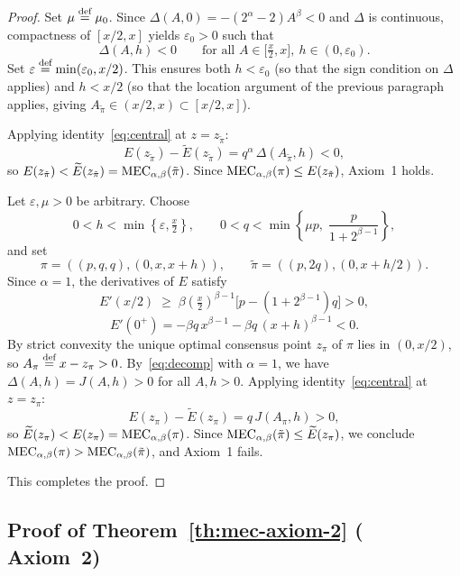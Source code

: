 \begin{proof}
Set $\mu\stackrel{\text{def}}{=}\mu_0$. Since $\Delta(A,0)=-(2^\alpha-2)A^\beta<0$ and $\Delta$ is continuous,
compactness of $[x/2,x]$ yields $\varepsilon_0>0$ such that
\[
  \Delta(A,h)<0
  \qquad\text{for all }A\in\bigl[\tfrac x2,x\bigr],\ h\in(0,\varepsilon_0).
\]
Set $\varepsilon\stackrel{\text{def}}{=}\min(\varepsilon_0,x/2)$. This ensures both $h<\varepsilon_0$ (so that the sign
condition on $\Delta$ applies) and $h<x/2$ (so that the location argument
of the previous paragraph applies, giving $A_{\tilde\pi}\in(x/2,x)\subset[x/2,x]$).

Applying identity~\eqref{eq:central} at $z=z_{\tilde\pi}$:
\[
  E(z_{\tilde\pi})-\widetilde{E}(z_{\tilde\pi})=q^\alpha\,\Delta(A_{\tilde\pi},h)<0,
\]
so $E(z_{\tilde\pi})<\widetilde{E}(z_{\tilde\pi})=\MEC(\tilde\pi)$. Since
$\MEC(\pi)\leq E(z_{\tilde\pi})$, Axiom~1 holds.

Let $\varepsilon,\mu>0$ be arbitrary. Choose
\[
  0<h<\min\!\left\{\varepsilon,\tfrac x2\right\},
  \qquad
  0<q<\min\!\left\{\mu p,\;\frac{p}{1+2^{\beta-1}}\right\},
\]
and set
\[
  \pi=((p,q,q),(0,x,x+h)),
  \qquad
  \tilde\pi=((p,2q),(0,x+h/2)).
\]
Since $\alpha=1$, the derivatives of $E$ satisfy
\[
  E'(x/2)\;\geq\;
  \beta\!\left(\tfrac x2\right)^{\!\beta-1}\!\bigl[p-(1+2^{\beta-1})q\bigr]>0,
\]
\[
  E'(0^+)=-\beta q\,x^{\beta-1}-\beta q\,(x+h)^{\beta-1}<0.
\]
By strict convexity the unique optimal consensus point $z_\pi$ of $\pi$ lies in $(0,x/2)$, so
$A_\pi\stackrel{\text{def}}{=} x-z_\pi>0$.
By~\eqref{eq:decomp} with $\alpha=1$, we have $\Delta(A,h)=J(A,h)>0$ for all $A,h>0$.
Applying identity~\eqref{eq:central} at $z=z_\pi$:
\[
  E(z_\pi)-\widetilde{E}(z_\pi)=q\,J(A_\pi,h)>0,
\]
so $\widetilde{E}(z_\pi)<E(z_\pi)=\MEC(\pi)$. Since $\MEC(\tilde\pi)\leq\widetilde{E}(z_\pi)$,
we conclude $\MEC(\pi)>\MEC(\tilde\pi)$, and Axiom~1 fails.

\medskip
This completes the proof.
\end{proof}

\subsection{Proof of Theorem~\ref{th:mec-axiom-2} (\texorpdfstring{\ERLabel}{ER} Axiom~2)}
\label{appendix:proof-mec-axiom-2}

